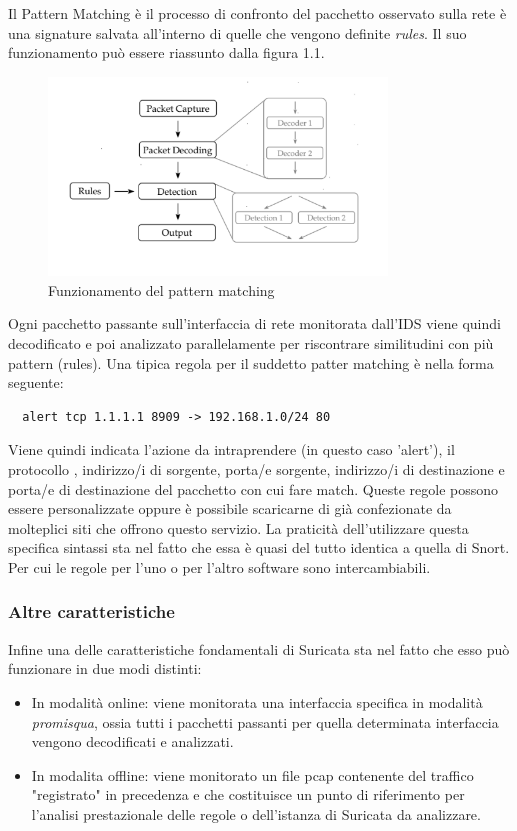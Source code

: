 \documentclass[12pt,a4paper,openright,twoside]{report}
\begin{document}
Il Pattern Matching \`e il processo di confronto del pacchetto osservato sulla rete
\`e una signature salvata all'interno di quelle che vengono definite {\it rules}.
Il suo funzionamento pu\`o
essere riassunto dalla figura 1.1. \cite{K2}
\begin{figure}
  \begin{center}                          %
    \includegraphics[width=90mm]{images/suricata-structure.png}
    \caption{Funzionamento del pattern matching}
    \label{}
  \end{center}
\end{figure}
Ogni pacchetto passante sull'interfaccia di rete monitorata dall'IDS viene quindi
decodificato e poi analizzato parallelamente per riscontrare similitudini con pi\`u pattern (rules).
Una tipica regola per il suddetto patter matching \`e nella forma seguente:
\begin{verbatim}
  alert tcp 1.1.1.1 8909 -> 192.168.1.0/24 80
\end{verbatim}
Viene quindi indicata l'azione da intraprendere (in questo caso 'alert'), il protocollo
, indirizzo/i di sorgente, porta/e sorgente, indirizzo/i di destinazione e porta/e di destinazione
del pacchetto con cui fare match.
Queste regole possono essere personalizzate oppure \`e possibile scaricarne di gi\`a confezionate
da molteplici siti che offrono questo servizio.
La praticit\`a dell'utilizzare questa specifica sintassi sta nel fatto che essa \`e quasi del
tutto identica a quella di Snort. Per cui le regole per l'uno o per l'altro software sono
intercambiabili.

\subsubsection{Altre caratteristiche}

Infine una delle caratteristiche fondamentali di Suricata sta nel fatto che esso pu\`o funzionare in
due modi distinti:
\begin{itemize}
  \item In modalit\`a online: viene monitorata una interfaccia specifica in modalit\`a {\it promisqua},
  ossia tutti i pacchetti passanti per quella determinata interfaccia vengono decodificati e analizzati.
  \item In modalita offline: viene monitorato un file pcap contenente del traffico
  "registrato" in precedenza e che costituisce un punto di riferimento per l'analisi
  prestazionale delle regole o dell'istanza di Suricata da analizzare.
\end{itemize}
\end{document}

